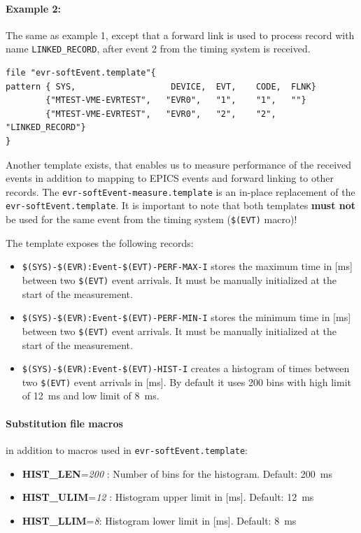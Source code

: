 \documentclass[12pt,a4paper]{article}
\begin{document}
\paragraph{Example 2:} The same as example 1, except that a forward link is used to process record with name \texttt{LINKED\_RECORD}, after event 2 from the timing system is received.

\begin{verbatim}
file "evr-softEvent.template"{
pattern { SYS,                   DEVICE,  EVT,    CODE,  FLNK}
        {"MTEST-VME-EVRTEST",   "EVR0",   "1",    "1",   ""}
        {"MTEST-VME-EVRTEST",   "EVR0",   "2",    "2",   "LINKED_RECORD"}
}
\end{verbatim}

Another template exists, that enables us to measure performance of the received events in addition to mapping to EPICS events and forward linking to other records. The \texttt{evr-softEvent-measure.template} is an in-place replacement of the  \texttt{evr-softEvent.template}. It is important to note that both templates \textbf{must not} be used for the same event from the timing system (\texttt{\$(EVT)} macro)! 

The template exposes the following records:
\begin{itemize}
\item 
  \texttt{\$(SYS)-\$(EVR):Event-\$(EVT)-PERF-MAX-I} stores the maximum time in [ms] between two \texttt{\$(EVT)} event arrivals. It must be manually initialized at the start of the measurement.
\item 
  \texttt{\$(SYS)-\$(EVR):Event-\$(EVT)-PERF-MIN-I} stores the minimum time in [ms] between two \texttt{\$(EVT)} event arrivals. It must be manually initialized at the start of the measurement.
\item 
  \texttt{\$(SYS)-\$(EVR):Event-\$(EVT)-HIST-I} creates a histogram of times between two \texttt{\$(EVT)} event arrivals in [ms]. By default it uses 200 bins with high limit of 12~ms and low limit of 8~ms.
\end{itemize}

\paragraph{Substitution file macros} in addition to macros used in \texttt{evr-softEvent.template}:
\begin{itemize}
	\item
		\textbf{HIST\_LEN}=\emph{200} : Number of bins for the histogram. Default: 200~ms
	\item
		\textbf{HIST\_ULIM}=\emph{12} : Histogram upper limit in [ms]. Default: 12~ms
	\item
	  \textbf{HIST\_LLIM}=\emph{8}: Histogram lower limit in [ms]. Default: 8~ms
\end{itemize}
 
\end{document}

